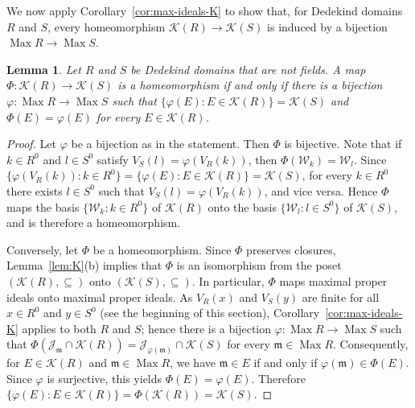 \documentclass[12pt,reqno,a4paper]{amsart}
\newcommand{\K}{\mathcal{K}}
\newcommand{\W}{\mathcal{W}}
\newcommand{\m}{\mathfrak{m}}
\DeclareMathOperator{\Max}{Max}
\theoremstyle{plain}
\newtheorem{lemma}[theorem]{Lemma}
\theoremstyle{definition}
\begin{document}
We now apply Corollary~\ref{cor:max-ideals-K} to show that, for Dedekind domains $R$ and $S$, every homeomorphism $\K(R)\to\K(S)$ is induced by a bijection $\Max R\to\Max S$.

\begin{lemma}\label{lem:dedekind-K}
Let $R$ and $S$ be Dedekind domains that are not fields. A map $\Phi\colon\K(R)\to\K(S)$ is a homeomorphism if and only if there is a bijection $\varphi\colon\Max R\to\Max S$ such that $\{\varphi(E):E\in\K(R)\}=\K(S)$ and $\Phi(E)=\varphi(E)$ for every $E\in\K(R)$.
\end{lemma}
\begin{proof}
Let $\varphi$ be a bijection as in the statement. Then $\Phi$ is bijective. Note that if $k\in R^0$ and $l\in S^0$ satisfy $V_S(l)=\varphi(V_R(k))$, then $\Phi(\W_k)=\W_l$. Since $\{\varphi(V_R(k)):k\in R^0\}=\{\varphi(E):E\in\K(R)\}=\K(S)$, for every $k\in R^0$ there exists $l\in S^0$ such that $V_S(l)=\varphi(V_R(k))$, and vice versa. Hence $\Phi$ maps the basis $\{\W_k:k\in R^0\}$ of $\K(R)$ onto the basis $\{\W_l:l\in S^0\}$ of $\K(S)$, and is therefore a homeomorphism.

Conversely, let $\Phi$ be a homeomorphism. Since $\Phi$ preserves closures, Lemma~\ref{lem:K}(b)  implies that $\Phi$ is an isomorphism from the poset $(\K(R),\subseteq)$ onto $(\K(S),\subseteq)$. In particular, $\Phi$ maps maximal proper ideals onto maximal proper ideals. As $V_R(x)$ and $V_S(y)$ are finite for all $x\in R^0$ and $y\in S^0$ (see the beginning of this section), Corollary~\ref{cor:max-ideals-K} applies to both $R$ and $S$; hence there is a bijection $\varphi\colon\Max R\to\Max S$ such that $\Phi(\mathcal{J}_\m\cap\K(R))=\mathcal{J}_{\varphi(\m)}\cap\K(S)$ for every $\m\in\Max R$. Consequently, for $E\in\K(R)$ and $\m\in\Max R$, we have $\m\in E$ if and only if $\varphi(\m)\in\Phi(E)$. Since $\varphi$ is surjective, this yields $\Phi(E)=\varphi(E)$. Therefore $\{\varphi(E):E\in\K(R)\}=\Phi(\K(R))=\K(S)$.
\end{proof}
\end{document}

